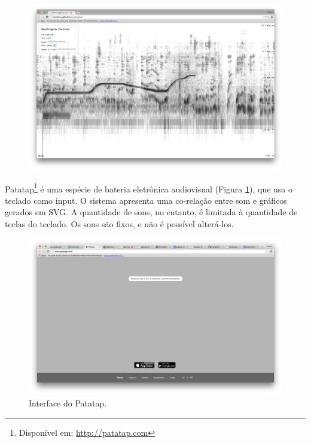 {\begin{figure}
        \includegraphics[width=1\linewidth]{pictures/cap2/spectrogramandoscilator}
    
\end{figure}

Patatap\footnote{Disponível em: \url{http://patatap.com}} é uma espécie de bateria eletrônica audiovisual (Figura \ref{patatap}), que usa o teclado como input. O sistema apresenta uma co-relação entre som e gráficos gerados em SVG. A quantidade de sons, no entanto, é limitada à quantidade de teclas do teclado. Os sons são fixos, e não é possível alterá-los.

\begin{figure}
    \caption{\label{patatap}Interface do Patatap.}
    
        \includegraphics[width=1\linewidth]{pictures/cap2/patatap}
    
\end{figure}

}
